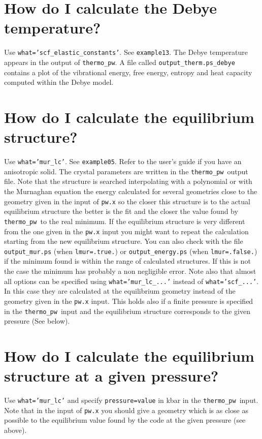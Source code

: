 \documentclass[12pt,a4paper]{article}
\def\thermo{\texttt{thermo\_pw}}
\begin{document}
\section{\color{coral}How do I calculate the Debye temperature?}
Use \texttt{what='scf\_elastic\_constants'}. See \texttt{example13}. The
Debye temperature appears in the output of \thermo. A file called
\texttt{output\_therm.ps\_debye} contains a plot of the vibrational
energy, free energy, entropy and heat capacity computed within the 
Debye model.

\section{\color{coral}How do I calculate the equilibrium structure?}
Use \texttt{what='mur\_lc'}. See \texttt{example05}. Refer to the user's
guide if you have an anisotropic solid. The crystal
parameters are written in the \thermo\ output file. Note that the structure is
searched interpolating with a polynomial or with the Murnaghan
equation the energy calculated for several geometries close to the geometry 
given in the input of \texttt{pw.x} so the closer this structure is to the 
actual equilibrium structure the better is the fit and the
closer the value found by \thermo\ to the real minimum. If the 
equilibrium structure is very different from the one given in the 
\texttt{pw.x} input you might want to repeat the calculation starting 
from the new equilibrium structure. You can also check with the file
\texttt{output\_mur.ps} (when \texttt{lmur=.true.}) or 
\texttt{output\_energy.ps} (when \texttt{lmur=.false.}) if the minimum
found is within the range of calculated structures. If this is not 
the case the minimum has probably a non negligible error.
Note also that almost all options can be specified using
\texttt{what='mur\_lc\_...'} instead of \texttt{what='scf\_...'}.
In this case they are calculated at the equilibrium geometry instead of
the geometry given in the \texttt{pw.x} input. 
This holds also if a finite pressure is specified in the \thermo\ input 
and the equilibrium structure corresponds to the given pressure (See below).

\section{\color{coral}How do I calculate the equilibrium structure 
at a given pressure?}
Use \texttt{what='mur\_lc'} and specify \texttt{pressure=value} in kbar in the
\thermo\ input. Note that in the input of \texttt{pw.x} you should 
give a geometry which is as close as possible to the equilibrium value
found by the code at the given pressure (see above).
\end{document}
